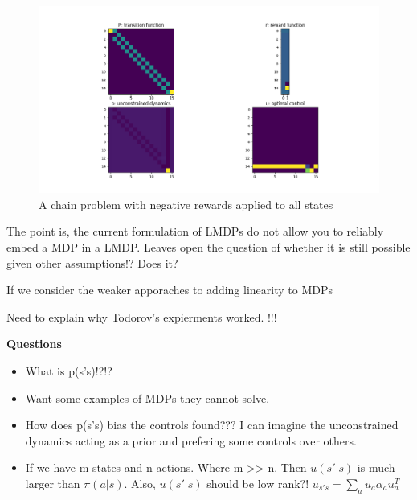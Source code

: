 \begin{figure}
\centering
\includegraphics[width=1\textwidth,height=0.35\textheight]{../../pictures/figures/chain-test-neg-rewards.png}
\caption{A chain problem with negative rewards applied to all states}
\end{figure}

The point is, the current formulation of LMDPs do not allow you to reliably embed a MDP in a LMDP.
Leaves open the question of whether it is still possible given other assumptions!? Does it?

If we consider the weaker apporaches to adding linearity to MDPs


Need to explain why Todorov's expierments worked. !!!


\textbf{Questions}

\begin{itemize}
\tightlist
\item
  What is p(s'\textbar{}s)!?!?
\item  Want some examples of MDPs they cannot solve.
\item
  How does p(s'\textbar{}s) bias the controls found??? I can imagine the
  unconstrained dynamics acting as a prior and prefering some controls
  over others.
\item
  If we have m states and n actions. Where m
  \textgreater{}\textgreater{} n. Then \(u(s'|s)\) is much larger than
  \(\pi(a|s)\). Also, \(u(s'|s)\) should be low rank?!
  \(u_{s's} = \sum_a u_a \alpha_a u_a^T\)
\end{itemize}
